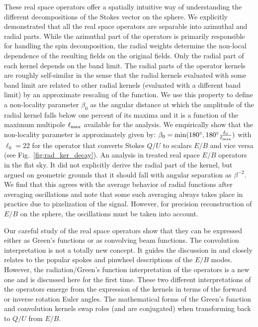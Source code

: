 \documentclass[a4paper,11pt]{article}
\def\fig#1{{Fig.~\ref{#1}}}
\begin{document}
These real space operators offer a spatially intuitive way of understanding the different decompositions of the Stokes vector on the sphere. We explicitly  demonstrated that all the real space operators are separable into azimuthal and radial parts. While the azimuthal part of the operators is primarily responsible for handling the spin decomposition, the radial weights determine the non-local dependence of the resulting fields on the original fields.  Only the radial part of each kernel depends on the band limit. 
The radial parts of the operator kernels are roughly self-similar in the sense that the radial kernels evaluated with some band limit are related to other radial kernels (evaluated with a different band limit) by an approximate rescaling of the function. We use this property to define a non-locality parameter $\beta_0$ as the angular distance at which the amplitude of the radial kernel falls below one percent of its maxima and it  is a function of the maximum multipole $\ell_{\rm max}$ available for the analysis. We empirically show that the non-locality parameter is approximately given by: $\beta_0 = \mathrm{min}(180^{\circ}, 180^{\circ} \frac{\ell_{0}}{\ell_{\rm max}})$ with $\ell_{0}=22$ for the operator that converts Stokes $Q/U$ to scalars $E/B$ and vice versa (see \fig{fig:rad_ker_decay}). An analysis in  \cite{Zaldarriaga2001a} treated real space $E/B$ operators in the flat sky.  It did not explicitly derive the radial part of the kernel, but argued on geometric grounds that it should fall with angular separation as $\beta^{-2}$.  We find that this agrees with the average behavior of radial functions after averaging oscillations and note that some such averaging always takes place in practice due to pixelization of the signal.  However, for precision reconstruction of $E/B$ on the sphere, the oscillations must be taken into account.

Our careful study of the real space operators show that they can be expressed either as Green's functions or as convolving beam functions.  The convolution interpretation is not a totally new concept.  It guides the discussion in \cite{Zaldarriaga2001a,Chiueh2002} and closely relates to the popular spokes and pinwheel descriptions of the $E/B$ modes. However, the radiation/Green's function interpretation of the operators is a new one and is discussed here for the first time. These two different interpretations of the operators emerge from the expression of the kernels in terms of the forward or inverse rotation Euler angles.  The mathematical forms of the Green's function and convolution kernels swap roles (and are conjugated) when transforming back to $Q/U$ from $E/B$.
\end{document}
